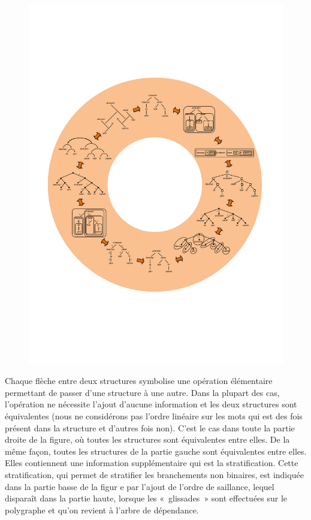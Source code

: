\begin{figure}
\caption{\label{fig:}}
\includegraphics[width=\textwidth]{figures/vol1syntaxe2-img028.png}
\end{figure}

Chaque flèche entre deux structures symbolise une opération élémentaire permettant de passer d’une structure à une autre. Dans la plupart des cas, l’opération ne nécessite l’ajout d’aucune information et les deux structures sont équivalentes (nous ne considérons pas l’ordre linéaire sur les mots qui est des fois présent dans la structure et d’autres fois non). C’est le cas dans toute la partie droite de la figure, où toutes les structures sont équivalentes entre elles. De la même façon, toutes les structures de la partie gauche sont équivalentes entre elles. Elles contiennent une information supplémentaire qui est la stratification. Cette stratification, qui permet de stratifier les branchements non binaires, est indiquée dans la partie basse de la figur    e par l’ajout de l’ordre de saillance, lequel disparaît dans la partie haute, lorsque les «~glissades~» sont effectuées sur le polygraphe et qu’on revient à l’arbre de dépendance.

